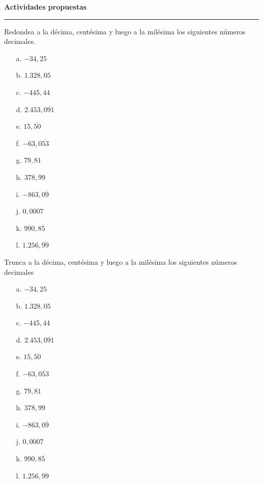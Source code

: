 \documentclass[spanish,letterpaper, 11pt, addpoints, answers]{exam}
\begin{document}
\begin{questions}
  \parbox{6in}{
    \textbf{Actividades propuestas}}
  \vspace{0.15in}
  \hrule

  \question Redondea a la décima, centésima y luego a la milésima los siguientes números decimales.
  \begin{multicols}{3}



    \begin{itemize}
      \item[a.] $-34{,}25$
      \item[b.] $1.328{,}05$
      \item[c.] $-445{,}44$
      \item[d.] $2.453{,}0\overline{91}$
      \item[e.] $15{,}\overline{50}$
      \item[f.] $-63{,}0\overline{53}$
      \item[g.] $79{,}81$
      \item[h.] $378{,}99$
      \item[i.] $-863{,}0\overline{9}$
      \item[j.] $0{,}0007$
      \item[k.] $990{,}8\overline{5}$
      \item[l.] $1.256{,}\overline{99}$
    \end{itemize}
  \end{multicols}

  \question Trunca a la décima, centésima y luego a la milésima los siguientes números decimales

  \begin{multicols}{3}



    \begin{itemize}
      \item[a.] $-34{,}25$
      \item[b.] $1.328{,}05$
      \item[c.] $-445{,}44$
      \item[d.] $2.453{,}0\overline{91}$
      \item[e.] $15{,}\overline{50}$
      \item[f.] $-63{,}0\overline{53}$
      \item[g.] $79{,}81$
      \item[h.] $378{,}99$
      \item[i.] $-863{,}0\overline{9}$
      \item[j.] $0{,}0007$
      \item[k.] $990{,}8\overline{5}$
      \item[l.] $1.256{,}\overline{99}$
    \end{itemize}
  \end{multicols}


\end{questions}
\end{document}
